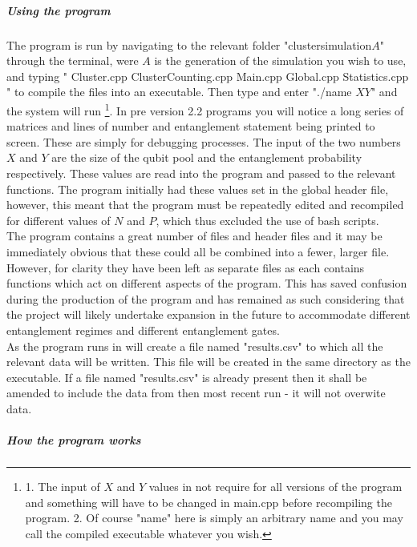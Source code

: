\documentclass{article}
\numberwithin{equation}{section} %
\begin{document}
 \subparagraph{Using the program}
 The program is run by navigating to the relevant folder "cluster\textunderscore simulation\textunderscore $A$" through the terminal, were $A$ is the generation of the simulation you wish to use, and typing " Cluster.cpp ClusterCounting.cpp Main.cpp Global.cpp Statistics.cpp " to compile the files into an executable. Then type and enter "./name $X Y$" and the system will run \footnote{1. The input of $X$ and $Y$ values in not require for all versions of the program and something will have to be changed in main.cpp before recompiling the program. 2. Of course "name" here is simply an arbitrary name and you may call the compiled executable whatever you wish.}. In pre version 2.2 programs you will notice a long series of matrices and lines of number and entanglement statement being printed to screen. These are simply for debugging processes. The input of the two numbers $X$ and $Y$ are the size of the qubit pool and the entanglement probability respectively. These values are read into the program and passed to the relevant functions. The program initially had these values set in the global header file, however, this meant that the program must be repeatedly edited and recompiled for different values of $N$ and $P$, which thus excluded the use of bash scripts.\\
 
 The program contains a great number of files and header files and it may be immediately obvious that these could all be combined into a fewer, larger file. However, for clarity they have been left as separate files as each contains functions which act on different aspects of the program. This has saved confusion during the production of the program and has remained as such considering that the project will likely undertake expansion in the future to accommodate different entanglement regimes and different entanglement gates. \\
 
 As the program runs in will create a file named "results.csv" to which all the relevant data will be written. This file will be created in the same directory as the executable. If a file named "results.csv" is already present then it shall be amended to include the data from then most recent run - it will not overwite data. \\
 

\subparagraph{How the program works} 
\end{document}
